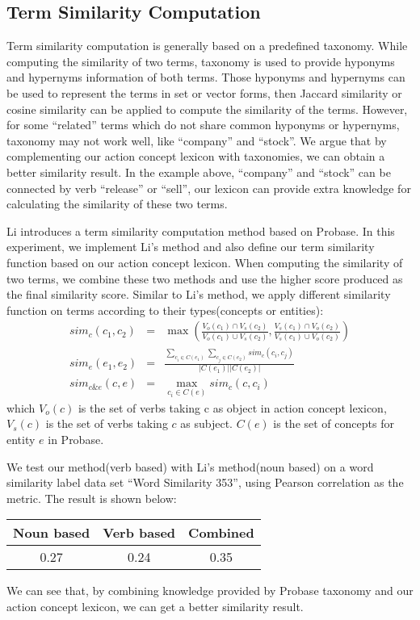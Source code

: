 \subsection{Term Similarity Computation}
Term similarity computation is generally based on a predefined taxonomy.
While computing the similarity of two terms, taxonomy is used to provide
hyponyms and hypernyms information of both terms. Those hyponyms and hypernyms
can be used to represent the terms in set or vector forms, then Jaccard similarity
or cosine similarity can be applied to compute the similarity of the terms.
However, for some ``related'' terms which do not share common hyponyms or
hypernyms, taxonomy may not work well, like ``company'' and ``stock''. We
argue that by complementing our action concept lexicon with taxonomies, we
can obtain a better similarity result. In the example above, ``company'' and
``stock'' can be connected by verb ``release'' or ``sell'', our lexicon can provide
extra knowledge for calculating the similarity of these two terms.

Li\cite{LiWZWW13} introduces a term similarity computation method based on Probase.
In this experiment, we implement Li's method and also define our term similarity
function based on our action concept lexicon. When computing the similarity
of two terms, we combine these two methods and use the higher score produced as
the final similarity score. Similar to Li's method, we apply different similarity
function on terms according to their types(concepts or entities):
\begin{eqnarray*}
sim_{c}(c_1,c_2) &=& \max(\frac{V_o(c_1)\cap V_s(c_2)}{V_o(c_1)\cup V_s(c_2)},\frac{V_s(c_1)\cap V_o(c_2)}{V_s(c_1)\cup V_o(c_2)}) \\
sim_{e}(e_1,e_2) &=& \frac{ \sum_{c_i \in C(e_1)}\sum_{c_j \in C(e_2)} sim_{c}(c_i,c_j) }{|C(e_1)||C(e_2)|} \\
sim_{c\&e}(c,e) &=& \max_{c_i \in C(e)}sim_c(c,c_i)
\end{eqnarray*}
which $V_o(c)$ is the set of verbs taking c as object in action concept lexicon, $V_s(c)$
is the set of verbs taking $c$ as subject. $C(e)$ is the set of concepts for entity $e$ in
Probase.

We test our method(verb based) with Li's method(noun based) on a word similarity label data set
``Word Similarity 353''\cite{LiWZWW13}, using Pearson correlation as the metric. The result is shown below:
\begin{table}[th]
\small
\centering
\begin{tabular}{|c|c|c|}
\hline
Noun based & Verb based & Combined \\
\hline
0.27 & 0.24 & 0.35 \\
\hline
\end{tabular}
\end{table}

We can see that, by combining knowledge provided by Probase taxonomy and our action concept
lexicon, we can get a better similarity result.

